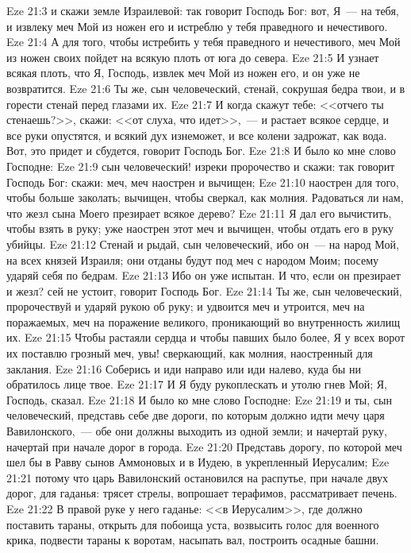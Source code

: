 \vs Eze 21:3 и скажи земле Израилевой: так говорит Господь Бог: вот, Я~--- на тебя, и извлеку меч Мой из ножен его и истреблю у тебя праведного и нечестивого.
\vs Eze 21:4 А для того, чтобы истребить у тебя праведного и нечестивого, меч Мой из ножен своих пойдет на всякую плоть от юга до севера.
\vs Eze 21:5 И узнает всякая плоть, что Я, Господь, извлек меч Мой из ножен его, и он уже не возвратится.
\vs Eze 21:6 Ты же, сын человеческий, стенай, сокрушая бедра твои, и в горести стенай перед глазами их.
\vs Eze 21:7 И когда скажут тебе: <<отчего ты стенаешь?>>, скажи: <<от слуха, что идет>>,~--- и растает всякое сердце, и все руки опустятся, и всякий дух изнеможет, и все колени задрожат, как вода. Вот, это придет и сбудется, говорит Господь Бог.
\rsbpar\vs Eze 21:8 И было ко мне слово Господне:
\vs Eze 21:9 сын человеческий! изреки пророчество и скажи: так говорит Господь Бог: скажи: меч, меч наострен и вычищен;
\vs Eze 21:10 наострен для того, чтобы больше заколать; вычищен, чтобы сверкал, как молния. Радоваться ли нам, что жезл сына Моего презирает всякое дерево?
\vs Eze 21:11 Я дал его вычистить, чтобы взять в руку; уже наострен этот меч и вычищен, чтобы отдать его в руку убийцы.
\vs Eze 21:12 Стенай и рыдай, сын человеческий, ибо он~--- на народ Мой, на всех князей Израиля; они отданы будут под меч с народом Моим; посему ударяй себя по бедрам.
\vs Eze 21:13 Ибо он уже испытан. И что, если он презирает и жезл? сей не устоит, говорит Господь Бог.
\vs Eze 21:14 Ты же, сын человеческий, пророчествуй и ударяй рукою об руку; и удвоится меч и утроится, меч на поражаемых, меч на поражение великого, проникающий во внутренность жилищ их.
\vs Eze 21:15 Чтобы растаяли сердца и чтобы павших было более, Я у всех ворот их поставлю грозный меч, увы! сверкающий, как молния, наостренный для заклания.
\vs Eze 21:16 Соберись и иди направо или иди налево, куда бы ни обратилось лице твое.
\vs Eze 21:17 И Я буду рукоплескать и утолю гнев Мой; Я, Господь, сказал.
\vs Eze 21:18 И было ко мне слово Господне:
\vs Eze 21:19 и ты, сын человеческий, представь себе две дороги, по которым должно идти мечу царя Вавилонского,~--- обе они должны выходить из одной земли; и начертай руку, начертай при начале дорог в города.
\vs Eze 21:20 Представь дорогу, по которой меч шел бы в Равву сынов Аммоновых и в Иудею, в укрепленный Иерусалим;
\vs Eze 21:21 потому что царь Вавилонский остановился на распутье, при начале двух дорог, для гаданья: трясет стрелы, вопрошает терафимов, рассматривает печень.
\vs Eze 21:22 В правой руке у него гаданье: <<в Иерусалим>>, где должно поставить тараны, открыть для побоища уста, возвысить голос для военного крика, подвести тараны к воротам, насыпать вал, построить осадные башни.
